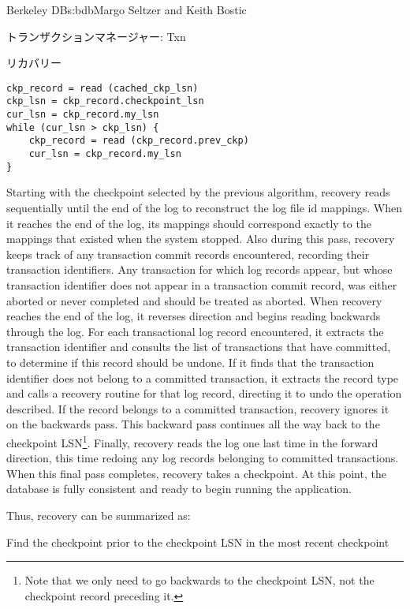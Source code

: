 \begin{aosachapter}{Berkeley DB}{s:bdb}{Margo Seltzer and Keith Bostic}
\begin{aosasect1}{トランザクションマネージャー: Txn}
\begin{aosasect2}{リカバリー}
\vspace{-0.2cm}
\begin{verbatim}
ckp_record = read (cached_ckp_lsn)
ckp_lsn = ckp_record.checkpoint_lsn
cur_lsn = ckp_record.my_lsn
while (cur_lsn > ckp_lsn) {
    ckp_record = read (ckp_record.prev_ckp)
    cur_lsn = ckp_record.my_lsn
}
\end{verbatim}
\vspace{-0.2cm}

Starting with the checkpoint selected by the previous algorithm,
recovery reads sequentially until the end of the log to reconstruct
the log file id mappings. When it reaches the end of the log, its
mappings should correspond exactly to the mappings that existed when
the system stopped.  Also during this pass, recovery keeps track of
any transaction commit records encountered, recording their 
transaction identifiers. Any transaction for which log records appear, but
whose transaction identifier does not appear in a transaction commit record,
was either aborted or never completed and should be treated as
aborted. When recovery reaches the end of the log, it reverses
direction and begins reading backwards through the log.  For each
transactional log record encountered, it extracts the transaction identifier
and consults the list of transactions that have committed, to
determine if this record should be undone. If it finds that the transaction
identifier does not belong to a committed transaction, it extracts the record
type and calls a recovery routine for that log record, directing it to
undo the operation described. If the record belongs to a committed
transaction, recovery ignores it on the backwards pass. This backward
pass continues all the way back to the checkpoint LSN\footnote{Note that we only
need to go backwards to the checkpoint LSN, not the checkpoint record
preceding it.}. Finally, recovery reads the log one last time in the
forward direction, this time redoing any log records belonging to
committed transactions. When this final pass completes, recovery takes
a checkpoint. At this point, the database is fully consistent and
ready to begin running the application.

Thus, recovery can be summarized as:

\vspace{-0.2cm}

\begin{aosaenumerate}

  \item Find the checkpoint prior to the checkpoint LSN in the most
  recent checkpoint


\end{aosaenumerate}
\end{aosasect2}
\end{aosasect1}
\end{aosachapter}
